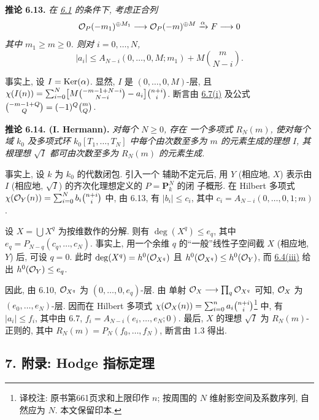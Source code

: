 \textbf{推论 6.13.} \emph{在 \hyperlink{sga6.e13.para.6-1}{6.1} 的条件下, 考虑正合列
\[
  \mathcal O_P(-m_1)^{\oplus M_1}\longrightarrow
  \mathcal O_P(-m)^{\oplus M}\xrightarrow{\alpha}F\longrightarrow0
\]
其中 $m_1\geq m\geq0$. 则对 $i=0,\ldots,N$,
\[
  |a_i|\leq A_{N-i}(0,\ldots,0,M;m_1)
  +M\binom{m}{N-i}.
\]}

事实上, 设 $I=\operatorname{Ker}(\alpha)$. 显然, $I$ 是
$(0,\ldots,0,M)$-层, 且
$\chi(I(n))=\allowbreak\sum_{i=0}^{N}
\bigl[M\tbinom{-m-1+N-i}{N-i}-a_i\bigr]\allowbreak\tbinom{n+i}{i}$.
断言由 \hyperlink{sga6.e13.thm.6-7}{6.7(i)} 及公式
$\tbinom{-m-1+Q}{Q}=(-1)^Q\tbinom{m}{Q}$.

\textbf{推论 6.14. (I. Hermann).} \emph{对每个 $N\geq0$, 存在
一个多项式 $R_N(m)$, 使对每个域 $k_0$ 及多项式环 $k_0[T_1,\ldots,T_N]$
中每个由次数至多为 $m$ 的元素生成的理想
$I$, 其根理想 $\sqrt I$ 都可由次数至多为
$R_N(m)$ 的元素生成.}

事实上, 设 $k$ 为 $k_0$ 的代数闭包. 引入一个
辅助不定元后, 用 $Y$ (相应地, $X$) 表示由 $I$
(相应地, $\sqrt I$) 的齐次化理想定义的 $P=\mathbf P^N_k$ 的闭
子概形. 在 Hilbert 多项式
$\chi(\mathcal O_Y(n))=\sum_{i=0}^{N}b_i\binom{n+i}{i}$ 中, 由 6.13, 有
$|b_i|\leq c_i$, 其中 $c_i=A_{N-i}(0,\ldots,0,1;m)$.

设 $X=\bigcup X^q$ 为按维数作的分解. 则有
$\deg(X^q)\leq e_q$, 其中 $e_q=P_{N-q}(c_q,\ldots,c_N)$.
事实上, 用一个余维 $q$ 的“一般”线性子空间截 $X$ (相应地, $Y$) 后, 可设 $q=0$. 此时
$\deg(X^q)=h^0(\mathcal O_{X^q})$ 且
$h^0(\mathcal O_{X^q})\leq h^0(\mathcal O_Y)$, 而 \hyperlink{sga6.e13.thm.6-4}{6.4(iii)} 给出
$h^0(\mathcal O_Y)\leq e_q$.

因此, 由 6.10, $\mathcal O_{X^q}$ 为 $(0,\ldots,0,e_q)$-层. 由
单射 $\mathcal O_X\longrightarrow\prod_q\mathcal O_{X^q}$ 可知,
$\mathcal O_X$ 为 $(e_0,\ldots,e_N)$-层. 因而在 Hilbert 多项式
$\chi(\mathcal O_X(n))=\sum_{i=0}^{n}a_i\binom{n+i}{i}$\footnote{译校注: 原书第661页求和上限印作 $n$; 按周围的 $N$ 维射影空间及系数序列, 自然应为 $N$. 本文保留印本.} 中, 有
$|a_i|\leq f_i$, 其中由 6.7, $f_i=A_{N-i}(e_i,\ldots,e_N;0)$.
最后, $X$ 的理想 $\sqrt I$ 为 $R_N(m)$-正则的, 其中
$R_N(m)=P_N(f_0,\ldots,f_N)$, 断言由 1.3 得出.

\subsection*{7. 附录: Hodge 指标定理}

